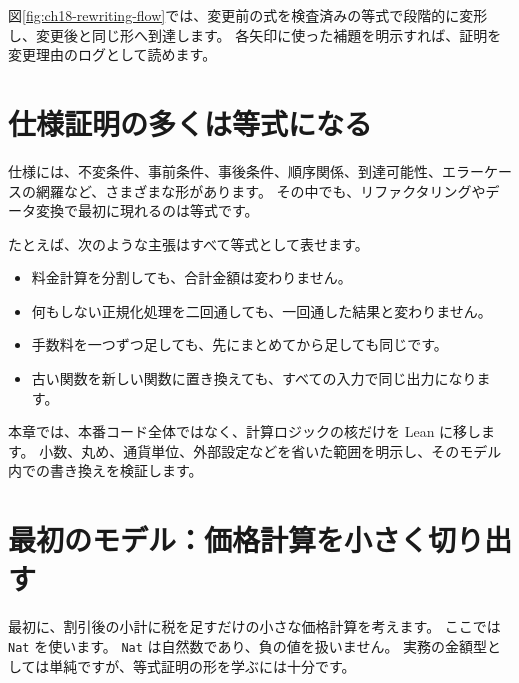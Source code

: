 図\ref{fig:ch18-rewriting-flow}では、変更前の式を検査済みの等式で段階的に変形し、変更後と同じ形へ到達します。
各矢印に使った補題を明示すれば、証明を変更理由のログとして読めます。


\section{仕様証明の多くは等式になる}

仕様には、不変条件、事前条件、事後条件、順序関係、到達可能性、エラーケースの網羅など、さまざまな形があります。
その中でも、リファクタリングやデータ変換で最初に現れるのは等式です。

たとえば、次のような主張はすべて等式として表せます。

\begin{itemize}
\item 料金計算を分割しても、合計金額は変わりません。
\item 何もしない正規化処理を二回通しても、一回通した結果と変わりません。
\item 手数料を一つずつ足しても、先にまとめてから足しても同じです。
\item 古い関数を新しい関数に置き換えても、すべての入力で同じ出力になります。
\end{itemize}

本章では、本番コード全体ではなく、計算ロジックの核だけを Lean に移します。
小数、丸め、通貨単位、外部設定などを省いた範囲を明示し、そのモデル内での書き換えを検証します。

\section{最初のモデル：価格計算を小さく切り出す}

最初に、割引後の小計に税を足すだけの小さな価格計算を考えます。
ここでは \texttt{Nat} を使います。
\texttt{Nat} は自然数であり、負の値を扱いません。
実務の金額型としては単純ですが、等式証明の形を学ぶには十分です。

